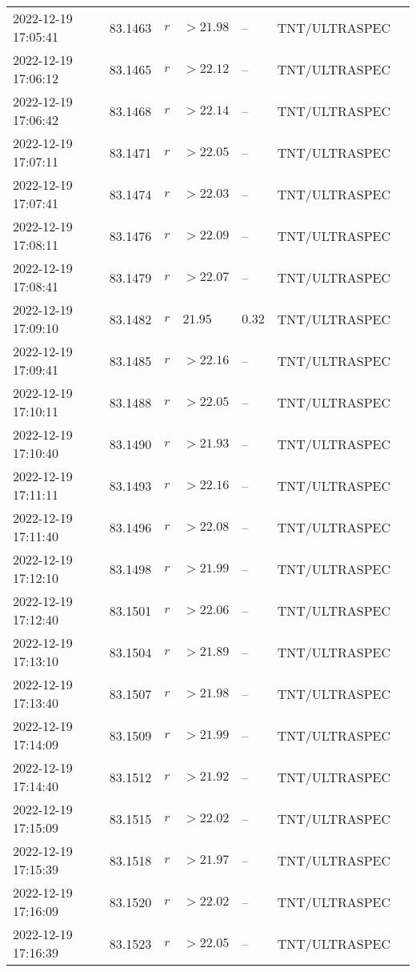 \documentclass{nature_plusfigure}
\begin{document}
\begin{supplement}
\begin{center}
\begin{longtable}{lllllll}
2022-12-19 17:05:41 & 83.1463 & $r$ & $>21.98$ & -- & TNT/ULTRASPEC &  \\ 
2022-12-19 17:06:12 & 83.1465 & $r$ & $>22.12$ & -- & TNT/ULTRASPEC &  \\ 
2022-12-19 17:06:42 & 83.1468 & $r$ & $>22.14$ & -- & TNT/ULTRASPEC &  \\ 
2022-12-19 17:07:11 & 83.1471 & $r$ & $>22.05$ & -- & TNT/ULTRASPEC &  \\ 
2022-12-19 17:07:41 & 83.1474 & $r$ & $>22.03$ & -- & TNT/ULTRASPEC &  \\ 
2022-12-19 17:08:11 & 83.1476 & $r$ & $>22.09$ & -- & TNT/ULTRASPEC &  \\ 
2022-12-19 17:08:41 & 83.1479 & $r$ & $>22.07$ & -- & TNT/ULTRASPEC &  \\ 
2022-12-19 17:09:10 & 83.1482 & $r$ & $21.95$ & $0.32$ & TNT/ULTRASPEC &  \\ 
2022-12-19 17:09:41 & 83.1485 & $r$ & $>22.16$ & -- & TNT/ULTRASPEC &  \\ 
2022-12-19 17:10:11 & 83.1488 & $r$ & $>22.05$ & -- & TNT/ULTRASPEC &  \\ 
2022-12-19 17:10:40 & 83.1490 & $r$ & $>21.93$ & -- & TNT/ULTRASPEC &  \\ 
2022-12-19 17:11:11 & 83.1493 & $r$ & $>22.16$ & -- & TNT/ULTRASPEC &  \\ 
2022-12-19 17:11:40 & 83.1496 & $r$ & $>22.08$ & -- & TNT/ULTRASPEC &  \\ 
2022-12-19 17:12:10 & 83.1498 & $r$ & $>21.99$ & -- & TNT/ULTRASPEC &  \\ 
2022-12-19 17:12:40 & 83.1501 & $r$ & $>22.06$ & -- & TNT/ULTRASPEC &  \\ 
2022-12-19 17:13:10 & 83.1504 & $r$ & $>21.89$ & -- & TNT/ULTRASPEC &  \\ 
2022-12-19 17:13:40 & 83.1507 & $r$ & $>21.98$ & -- & TNT/ULTRASPEC &  \\ 
2022-12-19 17:14:09 & 83.1509 & $r$ & $>21.99$ & -- & TNT/ULTRASPEC &  \\ 
2022-12-19 17:14:40 & 83.1512 & $r$ & $>21.92$ & -- & TNT/ULTRASPEC &  \\ 
2022-12-19 17:15:09 & 83.1515 & $r$ & $>22.02$ & -- & TNT/ULTRASPEC &  \\ 
2022-12-19 17:15:39 & 83.1518 & $r$ & $>21.97$ & -- & TNT/ULTRASPEC &  \\ 
2022-12-19 17:16:09 & 83.1520 & $r$ & $>22.02$ & -- & TNT/ULTRASPEC &  \\ 
2022-12-19 17:16:39 & 83.1523 & $r$ & $>22.05$ & -- & TNT/ULTRASPEC &  \\ 

\end{longtable}
\end{center}
\end{supplement}
\end{document}
